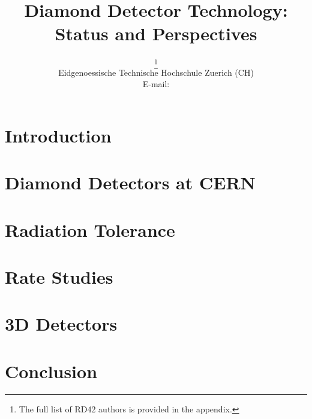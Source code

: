 \documentclass{PoS}
\title{Diamond Detector Technology: Status and Perspectives}
\author{\speaker{Michael Reichmann}%
        \thanks{The full list of RD42 authors is provided in the appendix.}\\
       Eidgenoessische Technische Hochschule Zuerich (CH)\\
       E-mail: \email{michael.reichmann@cern.ch}}
\begin{document}
\section{Introduction}


\section{Diamond Detectors at CERN}


\section{Radiation Tolerance}\label{rad}


\section{Rate Studies}


\section{3D Detectors}\label{3D}


\section{Conclusion}




\newpage


\end{document}
